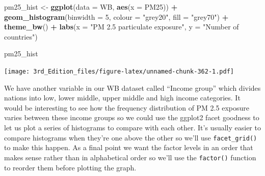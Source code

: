 \documentclass[
]{book}
\newenvironment{Shaded}{\begin{snugshade}}{\end{snugshade}}
\newcommand{\DataTypeTok}[1]{\textcolor[rgb]{0.13,0.29,0.53}{#1}}
\newcommand{\DecValTok}[1]{\textcolor[rgb]{0.00,0.00,0.81}{#1}}
\newcommand{\KeywordTok}[1]{\textcolor[rgb]{0.13,0.29,0.53}{\textbf{#1}}}
\newcommand{\NormalTok}[1]{#1}
\newcommand{\OperatorTok}[1]{\textcolor[rgb]{0.81,0.36,0.00}{\textbf{#1}}}
\newcommand{\StringTok}[1]{\textcolor[rgb]{0.31,0.60,0.02}{#1}}
\begin{document}
\begin{Shaded}
\begin{Highlighting}[]
\NormalTok{pm25_hist <-}\StringTok{ }\KeywordTok{ggplot}\NormalTok{(}\DataTypeTok{data =}\NormalTok{ WB, }\KeywordTok{aes}\NormalTok{(}\DataTypeTok{x =}\NormalTok{ PM25)) }\OperatorTok{+}
\StringTok{        }\KeywordTok{geom_histogram}\NormalTok{(}\DataTypeTok{binwidth =} \DecValTok{5}\NormalTok{, }\DataTypeTok{colour =} \StringTok{"grey20"}\NormalTok{, }\DataTypeTok{fill =} \StringTok{"grey70"}\NormalTok{) }\OperatorTok{+}
\StringTok{        }\KeywordTok{theme_bw}\NormalTok{() }\OperatorTok{+}
\StringTok{        }\KeywordTok{labs}\NormalTok{(}\DataTypeTok{x =} \StringTok{"PM 2.5 particulate exposure"}\NormalTok{,}
             \DataTypeTok{y =} \StringTok{"Number of countries"}\NormalTok{)}

\NormalTok{pm25_hist}
\end{Highlighting}
\end{Shaded}

\texttt{[image: 3rd\_Edition\_files/figure-latex/unnamed-chunk-362-1.pdf]}

We have another variable in our WB dataset called ``Income group'' which divides nations into low, lower middle, upper middle and high income categories. It would be interesting to see how the frequency distribution of PM 2.5 exposure varies between these income groups so we could use the ggplot2 facet goodness to let us plot a series of histograms to compare with each other. It's usually easier to compare histograms when they're one above the other so we'll use \texttt{facet\_grid()} to make this happen. As a final point we want the factor levels in an order that makes sense rather than in alphabetical order so we'll use the \texttt{factor()} function to reorder them before plotting the graph.
\end{document}
